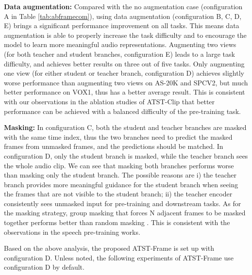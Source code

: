\textbf{Data augmentation:} Compared with the no augmentation case (configuration A in Table \ref{tab:abframecom}), using data augmentation (configuration B, C, D, E) brings a significant performance improvement on all tasks. This means data augmentation is able to properly increase the task difficulty and to encourage the model to learn more meaningful audio representations. Augmenting two views (for both teacher and student branches, configuration E) leads to a large task difficulty, and achieves better results on three out of five tasks. Only augmenting one view (for either student or teacher branch, configuration D) achieves slightly worse performance than augmenting two views on AS-20K and SPCV2, but much better performance on VOX1, thus has a better average result. This is consistent with our observations in the ablation studies of ATST-Clip that better performance can be achieved with a balanced difficulty of the pre-training task. 

\textbf{Masking:}
In configuration C, both the student and teacher branches are masked with the same time index, thus the two branches need to predict the masked frames from unmasked frames, and the predictions should be matched.
In configuration D, only the student branch is masked, while the teacher branch sees the whole audio clip. We can see that masking both branches performs worse than masking only the student branch. The possible reasons are i) the teacher branch provides more meaningful guidance for the student branch when seeing the frames that are not visible to the student branch; ii) the teacher encoder consistently sees unmasked input for pre-training and downstream tasks. As for the masking strategy, group masking that forces N adjacent frames to be masked together performs better than random masking . This is consistent with the observations in the speech pre-training works\cite{baevski_wav2vec_2020,baevski_data2vec_2022}.

Based on the above analysis, the proposed ATST-Frame is set up with configuration D. Unless noted, the following experiments of ATST-Frame use configuration D by default. 


